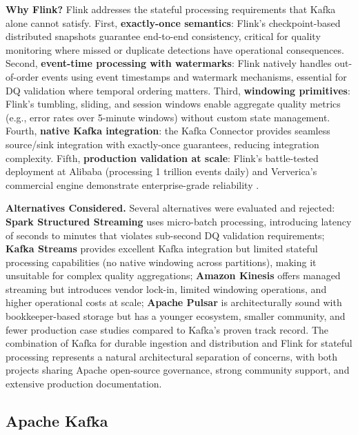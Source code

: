 \textbf{Why Flink?} Flink addresses the stateful processing requirements that Kafka alone cannot satisfy. First, \textbf{exactly-once semantics}: Flink's checkpoint-based distributed snapshots guarantee end-to-end consistency, critical for quality monitoring where missed or duplicate detections have operational consequences. Second, \textbf{event-time processing with watermarks}: Flink natively handles out-of-order events using event timestamps and watermark mechanisms, essential for DQ validation where temporal ordering matters. Third, \textbf{windowing primitives}: Flink's tumbling, sliding, and session windows enable aggregate quality metrics (e.g., error rates over 5-minute windows) without custom state management. Fourth, \textbf{native Kafka integration}: the Kafka Connector provides seamless source/sink integration with exactly-once guarantees, reducing integration complexity. Fifth, \textbf{production validation at scale}: Flink's battle-tested deployment at Alibaba (processing 1 trillion events daily) and Ververica's commercial engine demonstrate enterprise-grade reliability \citep{alibaba_flink2024, ververica2024}.

\textbf{Alternatives Considered.} Several alternatives were evaluated and rejected: \textbf{Spark Structured Streaming} uses micro-batch processing, introducing latency of seconds to minutes that violates sub-second DQ validation requirements; \textbf{Kafka Streams} provides excellent Kafka integration but limited stateful processing capabilities (no native windowing across partitions), making it unsuitable for complex quality aggregations; \textbf{Amazon Kinesis} offers managed streaming but introduces vendor lock-in, limited windowing operations, and higher operational costs at scale; \textbf{Apache Pulsar} is architecturally sound with bookkeeper-based storage but has a younger ecosystem, smaller community, and fewer production case studies compared to Kafka's proven track record. The combination of Kafka for durable ingestion and distribution and Flink for stateful processing represents a natural architectural separation of concerns, with both projects sharing Apache open-source governance, strong community support, and extensive production documentation.

\subsection{Apache Kafka}

